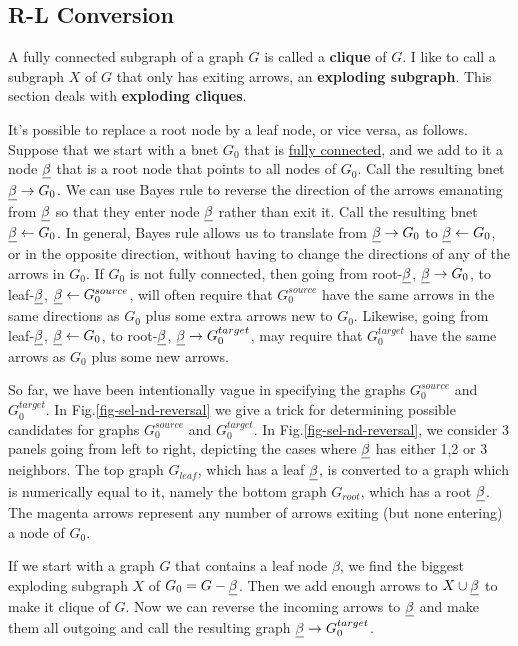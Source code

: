 \subsection{R-L Conversion}

A fully connected subgraph of 
a graph $G$ is called a 
{\bf clique} of $G$.
I like to call a subgraph $X$  of $G$ that only has exiting arrows, an 
{\bf exploding subgraph}.
This section deals with
 {\bf exploding cliques}.


It's possible to replace a root node
by a leaf node, or vice versa, as
follows.
Suppose that we start with
a bnet $G_0$ that is \ul{fully connected}, and
we add to it a node $\rvbeta$
that is a root node that points
to all nodes of $G_0$.
Call the resulting bnet $\rvbeta\rarrow G_0$.
We can use Bayes rule to reverse the direction
of the arrows emanating from $\rvbeta$
so that they enter node $\rvbeta$
rather than exit
it.
Call the resulting bnet $\rvbeta\larrow G_0$.
In general,
Bayes rule allows us to translate
from $\rvbeta\rarrow G_0$ to
$\rvbeta\larrow G_0$,
or in the opposite direction,
without having to change the
directions of any of the arrows in $G_0$.
If $G_0$ is not fully connected, then
going from root-$\rvbeta$,
$\rvbeta\rarrow G_0$, to leaf-$\rvbeta$,
$\rvbeta\larrow G_0^{source}$,
will often require that $G_0^{source}$
have the same arrows in the same
directions as $G_0$
plus some extra arrows
new to $G_0$.
Likewise, going
from leaf-$\rvbeta$, $\rvbeta\larrow G_0$, to root-$\rvbeta$,
$\rvbeta\rarrow G_0^{target}$,
may require that $G_0^{target}$ have
the same arrows as $G_0$ plus some new arrows.

So far, we have
been intentionally
vague in specifying the graphs
$G_0^{source}$ and $G_0^{target}$.
In Fig.\ref{fig-sel-nd-reversal}
we give a trick for determining
possible candidates for
graphs $G_0^{source}$ and $G_0^{target}$.
In
Fig.\ref{fig-sel-nd-reversal},
we consider 3 panels going from left
to right, depicting
the cases where $\rvbeta$ has either 1,2 or 3 neighbors.
The top graph
 $G_{leaf}$, which has
a leaf $\rvbeta$, is converted
to a graph which is numerically
equal to it, namely
the bottom
graph
 $G_{root}$, which has
a root $\rvbeta$.
The magenta arrows represent
any number of arrows
exiting (but none entering)
a node of $G_0$.

If we start with a graph $G$ that contains a leaf node $\beta$, 
we find the biggest exploding subgraph $X$ of
$G_0 =G  -\rvbeta$.
Then we add enough
arrows to $X\cup \rvbeta$
to make it clique of $G$.
Now we can reverse the incoming
arrows to $\rvbeta$ and make them
all outgoing and call the
resulting graph $\rvbeta\rarrow G_0^{target}$.




